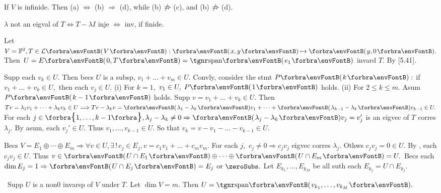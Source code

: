 \vspace{6pt}

\BulletPointX\NoteForSmall{[5.6]}\;\;If $V$ is infinide. Then (a) $\Longleftrightarrow$ (b) $\Rightarrow$ (d), while (b) $\notRightarrow$(c), and (b) $\notRightarrow$(d).\par
\BulletPointX\AComm $\lambda$ not an eigval of $T\Longleftrightarrow{T-\lambda I}$ inje $\Longleftrightarrow$ inv, if finide.
\SepLine

Let $V=\Fbb^2,T\in\Lm{V}:\Par{x,y}\mapsto\Par{y,0}.$ Then $U=E\Par{0,T}=\Span{e_1}$ invard $T.$ By [5.41].\PfEnd
\SepLine

Supp each $v_k\in U.$ Then becs $U$ is a subsp, $v_1+\dots+v_m\in U.$\parSol{}
Convly, consider the stmt $P\Par{k}:$ if $v_1+\dots+v_k\in U,$ then each $v_j\in U.$\parSol{}
(i) For $k=1,$ $v_1\in U,\;P\Par{1}$ holds.\parSol{\Endi}
(ii) For $2\leqslant k\leqslant m.$ Asum $P\Par{k-1}$ holds. Supp $v=v_1+\dots+v_k\in U.$\parSol{\Hii}
Then $Tv=\lambda_1v_1+\dots+\lambda_k v_k\in U\Longrightarrow Tv-\lambda_k v=\Par{\lambda_1-\lambda_k}v_1+\dots+\Par{\lambda_{k-1}-\lambda_k}v_{k-1}\in U.$\parSol{\Hii}
For each $j\in\Bra{1,\dots,k-1},\lambda_j-\lambda_{k}\neq 0\Rightarrow\Par{\lambda_j-\lambda_k}v_j=v_j'$ is an eigvec of $T$ corres $\lambda_j.$\parSol{\Hii}
By asum, each $v_j'\in U.$ Thus $v_1,\dots,v_{k-1}\in U.$ So that $v_k=v-v_1-\dots-v_{k-1}\in U.$\PfEnd
\SepLine[0pt][\Blind{\BulletPointX} ]

Becs $V=E_1\oplus\cdots\oplus E_m\Rightarrow\forall v\in U,\exists\,!\,c_j\in E_j,v=c_1v_1+\dots+c_mv_m.$\parSol{}
For each $j,$ $c_j\neq 0\Rightarrow c_jv_j$ eigvec corres $\lambda_j.$ Othws $c_jv_j=0\in U.$\parSol{}
By , each $c_jv_j\in U.$ Thus $v\in\Par{U\cap E_1}\oplus\dots\oplus\Par{U\cap E_m}=U.$\PfEnd\vspace{2pt}
\ACoro Becs each $\dim E_j=1\Rightarrow\Par{U\cap E_j}=E_j$ or $\zeroSubs.$ Let $E_{k_1},\dots,E_{k_M}$ be all suth each $E_{k_j}=U\cap E_{k_j}.$\par
{}\BulletPointX{}\,\,\,{\tgsl Supp $U$ is a non0 invarsp of $V$ under $T.$ Let $\dim V=m.$ Then $U=\Span{v_{k_1},\dots,v_{k_M}}.$}
\SepLine

